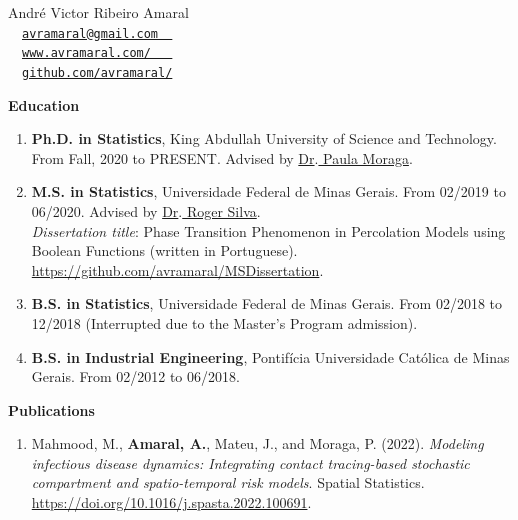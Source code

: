 \documentclass[11pt, ]{article}
\begin{document}
	
	\begin{center}
		{\LARGE André Victor Ribeiro Amaral} \\ \vspace{6pt}
		{\small\faEnvelope~~\href{mailto:avramaral@gmail.com}{\texttt{avramaral@gmail.com~~}}} \\
		{\small\faDesktop~~\href{https://www.avramaral.com/}{\texttt{www.avramaral.com/~~~}}}	\\
		{\small\faGithubAlt~~\href{https://github.com/avramaral/}{\texttt{github.com/avramaral/}}}	
	\end{center}

{\Large \textbf{Education}}

	\begin{enumerate}
		\item \textbf{Ph.D. in Statistics}, King Abdullah University of Science and Technology. From Fall, 2020 to PRESENT. Advised by \href{https://www.paulamoraga.com/}{Dr$\text{.}$ Paula Moraga}.
		
		\item \textbf{M.S. in Statistics}, Universidade Federal de Minas Gerais. From 02/2019 to 06/2020. Advised by \href{http://www.est.ufmg.br/~rogerwcs/}{Dr$\text{.}$ Roger Silva}. \\
		\textit{Dissertation title}: Phase Transition Phenomenon in Percolation Models using Boolean Functions (written in Portuguese). \href{https://github.com/avramaral/MSDissertation}{https://github.com/avramaral/MSDissertation}.
		
		\item \textbf{B.S. in Statistics}, Universidade Federal de Minas Gerais. From 02/2018 to 12/2018 (Interrupted due to the Master's Program admission).
		
		\item \textbf{B.S. in Industrial Engineering}, Pontifícia Universidade Católica de Minas Gerais. From 02/2012 to 06/2018.
	
	\end{enumerate}

\vspace{6pt}

{\Large \textbf{Publications}}

	\begin{enumerate}
		\item  Mahmood, M., \textbf{Amaral, A.}, Mateu, J., and Moraga, P. (2022). \textit{Modeling infectious disease dynamics: Integrating contact tracing-based stochastic compartment and spatio-temporal risk models}. Spatial Statistics. \href{https://doi.org/10.1016/j.spasta.2022.100691}{https://doi.org/10.1016/j.spasta.2022.100691}.
	\end{enumerate}
\end{document}

